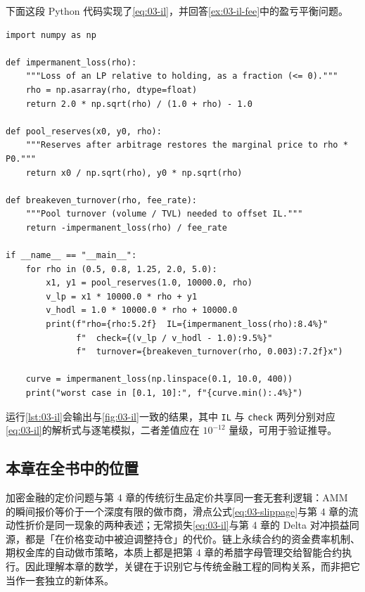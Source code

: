 下面这段 Python 代码实现了\cref{eq:03-il}，并回答\cref{ex:03-il-fee}中的盈亏平衡问题。

\begin{lstlisting}[style=pythonstyle,
                   caption={计算无常损失曲线与手续费盈亏平衡换手率},
                   label={lst:03-il}]
import numpy as np

def impermanent_loss(rho):
    """Loss of an LP relative to holding, as a fraction (<= 0)."""
    rho = np.asarray(rho, dtype=float)
    return 2.0 * np.sqrt(rho) / (1.0 + rho) - 1.0

def pool_reserves(x0, y0, rho):
    """Reserves after arbitrage restores the marginal price to rho * P0."""
    return x0 / np.sqrt(rho), y0 * np.sqrt(rho)

def breakeven_turnover(rho, fee_rate):
    """Pool turnover (volume / TVL) needed to offset IL."""
    return -impermanent_loss(rho) / fee_rate

if __name__ == "__main__":
    for rho in (0.5, 0.8, 1.25, 2.0, 5.0):
        x1, y1 = pool_reserves(1.0, 10000.0, rho)
        v_lp = x1 * 10000.0 * rho + y1
        v_hodl = 1.0 * 10000.0 * rho + 10000.0
        print(f"rho={rho:5.2f}  IL={impermanent_loss(rho):8.4%}"
              f"  check={(v_lp / v_hodl - 1.0):9.5%}"
              f"  turnover={breakeven_turnover(rho, 0.003):7.2f}x")

    curve = impermanent_loss(np.linspace(0.1, 10.0, 400))
    print("worst case in [0.1, 10]:", f"{curve.min():.4%}")
\end{lstlisting}

运行\cref{lst:03-il}会输出与\cref{fig:03-il}一致的结果，其中 \texttt{IL} 与 \texttt{check} 两列分别对应\cref{eq:03-il}的解析式与逐笔模拟，二者差值应在 $10^{-12}$ 量级，可用于验证推导。

\subsection{本章在全书中的位置}

加密金融的定价问题与第 4 章的传统衍生品定价共享同一套无套利逻辑：AMM 的瞬间报价等价于一个深度有限的做市商，滑点公式\cref{eq:03-slippage}与第 4 章的流动性折价是同一现象的两种表述；无常损失\cref{eq:03-il}与第 4 章的 Delta 对冲损益同源，都是「在价格变动中被迫调整持仓」的代价。链上永续合约的资金费率机制、期权金库的自动做市策略，本质上都是把第 4 章的希腊字母管理交给智能合约执行。因此理解本章的数学，关键在于识别它与传统金融工程的同构关系，而非把它当作一套独立的新体系。

